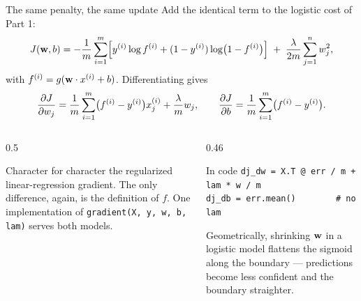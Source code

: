 \documentclass[aspectratio=169,10pt]{beamer}
\begin{document}
\begin{frame}{The same penalty, the same update}
  \small
  Add the identical term to the logistic cost of Part 1:
  \[
    J(\mathbf{w},b) = -\frac{1}{m}\sum_{i=1}^{m}
      \Bigl[y^{(i)}\log f^{(i)} + (1-y^{(i)})\log\bigl(1-f^{(i)}\bigr)\Bigr]
      \;+\; \frac{\lambda}{2m}\sum_{j=1}^{n}w_j^2 ,
  \]
  with $f^{(i)} = g(\mathbf{w}\cdot x^{(i)}+b)$. Differentiating gives
  \[
    \frac{\partial J}{\partial w_j}
      = \frac{1}{m}\sum_{i=1}^{m}\bigl(f^{(i)}-y^{(i)}\bigr)x^{(i)}_{j} + \frac{\lambda}{m}w_j ,
    \qquad
    \frac{\partial J}{\partial b}
      = \frac{1}{m}\sum_{i=1}^{m}\bigl(f^{(i)}-y^{(i)}\bigr) .
  \]
  \begin{columns}[T,onlytextwidth]
    \begin{column}{0.5\textwidth}
      \begin{keyidea}
        \footnotesize
        Character for character the regularized linear-regression gradient. The only
        difference, again, is the definition of $f$. One implementation of
        \texttt{gradient(X, y, w, b, lam)} serves both models.
      \end{keyidea}
    \end{column}
    \begin{column}{0.46\textwidth}
      \footnotesize
      \begin{block}{In code}
        \texttt{dj\_dw = X.T @ err / m + lam * w / m}\\
        \texttt{dj\_db = err.mean()\ \ \ \ \ \ \ \ \# no lam}
      \end{block}
      Geometrically, shrinking $\mathbf{w}$ in a logistic model flattens the sigmoid along the
      boundary --- predictions become less confident and the boundary straighter.
    \end{column}
  \end{columns}
\end{frame}
\end{document}
